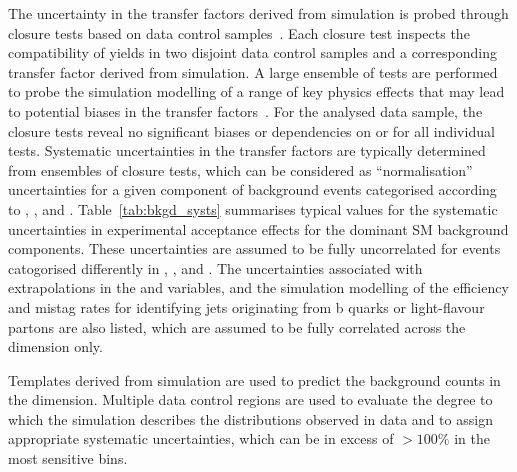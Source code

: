 The uncertainty in the transfer factors derived from simulation is
probed through closure tests based on data control
samples~\cite{RA1Paper2012}. Each closure test inspects the
compatibility of yields in two disjoint data control samples and a
corresponding transfer factor derived from simulation. A large
ensemble of tests are performed to probe the simulation modelling of a
range of key physics effects that may lead to potential biases in the
transfer factors~\cite{RA1Paper2012}. For the analysed data sample,
the closure tests reveal no significant biases or dependencies on
\njet or \scalht for all individual tests. Systematic uncertainties in
the transfer factors are typically determined from ensembles of
closure tests, which can be considered as ``normalisation''
uncertainties for a given component of background events categorised
according to \njet, \nb, and \scalht.  Table~\ref{tab:bkgd_systs}
summarises typical values for the systematic uncertainties in
experimental acceptance effects for the dominant SM background
components. These uncertainties are assumed to be fully uncorrelated
for events catogorised differently in \njet, \nb, and \scalht. The
uncertainties associated with extrapolations in the \alphat and \dphi
variables, and the simulation modelling of the efficiency and mistag
rates for identifying jets originating from b quarks or light-flavour
partons are also listed, which are assumed to be fully correlated
across the \nb dimension only.

Templates derived from simulation are used to predict the background
counts in the \mht dimension. Multiple data control regions are used
to evaluate the degree to which the simulation describes the \mht
distributions observed in data and to assign appropriate systematic
uncertainties, which can be in excess of $>100\%$ in the most
sensitive \mht bins.

